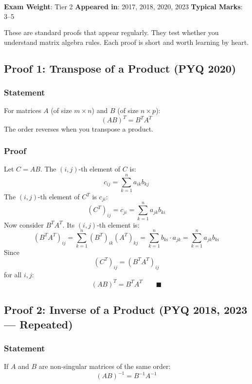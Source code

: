 \documentclass[
]{article}
\renewenvironment{quote}
  {\begin{tcolorbox}[
     colback=calloutbg,
     colframe=calloutframe,
     colupper=callouttext,
     arc=3pt,
     boxrule=0.5pt,
     leftrule=0.5pt,
     borderline west={3pt}{0pt}{calloutaccent},
     left=8pt,
     right=8pt,
     top=6pt,
     bottom=6pt
   ]}
  {\end{tcolorbox}}
\begin{document}
\begin{quote}
\textbf{Exam Weight}: Tier 2 \textbar{} \textbf{Appeared in}: 2017,
2018, 2020, 2023 \textbar{} \textbf{Typical Marks}: 3--5
\end{quote}

These are standard proofs that appear regularly. They test whether you
understand matrix algebra rules. Each proof is short and worth learning
by heart.

\subsection{Proof 1: Transpose of a Product (PYQ
2020)}\label{proof-1-transpose-of-a-product-pyq-2020}

\subsubsection{Statement}\label{statement-3}

For matrices \(A\) (of size \(m \times n\)) and \(B\) (of size
\(n \times p\)):
\[
(AB)^T = B^T A^T
\]
The order reverses when you transpose a product.

\subsubsection{Proof}\label{proof-3}

Let \(C = AB\). The \((i,j)\)-th element of \(C\) is:
\[
c_{ij} = \sum_{k=1}^{n} a_{ik} b_{kj}
\]
The \((i,j)\)-th element of \(C^T\) is \(c_{ji}\):
\[
(C^T)_{ij} = c_{ji} = \sum_{k=1}^{n} a_{jk} b_{ki}
\]
Now consider \(B^T A^T\). Its \((i,j)\)-th element is:
\[
(B^T A^T)_{ij} = \sum_{k=1}^{n} (B^T)_{ik}(A^T)_{kj} = \sum_{k=1}^{n} b_{ki} \cdot a_{jk} = \sum_{k=1}^{n} a_{jk} b_{ki}
\]
Since
\[
(C^T)_{ij} = (B^T A^T)_{ij}
\]
for all \(i,j\):
\[
(AB)^T = B^T A^T \qquad \blacksquare
\]

\subsection{Proof 2: Inverse of a Product (PYQ 2018, 2023 ---
Repeated)}\label{proof-2-inverse-of-a-product-pyq-2018-2023-repeated}

\subsubsection{Statement}\label{statement-4}

If \(A\) and \(B\) are non-singular matrices of the same order:
\[
(AB)^{-1} = B^{-1}A^{-1}
\]
\end{document}
